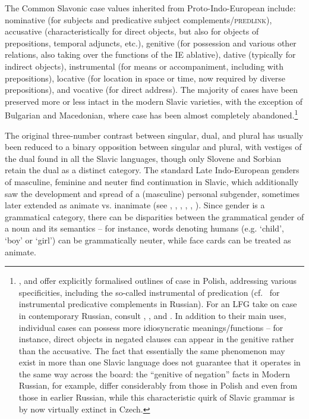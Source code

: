 \documentclass[output=paper,hidelinks]{langscibook}
\begin{document}
The Common Slavonic case values inherited from Proto-Indo-European include: nominative (for subjects and predicative subject complements/\textsc{predlink}), accusative (characteristically for direct objects, but also for objects of prepositions, temporal adjuncts, etc.), genitive (for possession and various other relations, also taking over the functions of the IE ablative), dative (typically for indirect objects), instrumental (for means or accompaniment, including with prepositions), locative (for location in space or time, now required by diverse prepositions), and vocative (for direct address). The majority of cases have been preserved more or less intact in the modern Slavic varieties, with the exception of Bulgarian and Macedonian, where case has been almost completely abandoned.\footnote{\citet{PrzepiorkowskiPatejuk2011,przepiorkowski-patejuk2012,prz:pat:12b,przepiorkowski2015two}, \citet{Patejuk2015} and \citet{PatejukPrzepiorkowski2014b,PatejukPrzepiorkowski2014a,PatejukPrzepiorkowski2018} offer explicitly formalised outlines of case in Polish, addressing various specificities, including the so-called instrumental of predication (cf.\ \citealt[192]{dalrympleetal04copular} for instrumental predicative complements in Russian). For an LFG take on case in contemporary Russian, consult \citet{Neidle1988}, \citet[Chapter 8]{King95}, and \citet[422--425]{BresnanEtAl2016}. In addition to their main uses, individual cases can possess more idiosyncratic meanings/functions -- for instance, direct objects in negated clauses can appear in the genitive rather than the accusative. The fact that essentially the same phenomenon may exist in more than one Slavic language does not guarantee that it operates in the same way across the board: the ``genitive of negation'' facts in Modern Russian, for example, differ considerably from those in Polish and even from those in earlier Russian, while this characteristic quirk of Slavic grammar is by now virtually extinct in Czech.}

The original three-number contrast between singular, dual, and plural has usually been reduced to a binary opposition between singular and plural, with vestiges of the dual found in all the Slavic languages, though only Slovene and Sorbian retain the dual as a distinct category. The standard Late Indo-European genders of masculine, feminine and neuter find continuation in Slavic, which additionally saw the development and spread of a (masculine) personal subgender, sometimes later extended as animate vs. inanimate (see \citealt[319, 363--364]{Browne1993}, \citealt[696--698]{Rothstein1993}, \citealt[108]{Schenker1993}, \citealt[836ff]{Timberlake1993}, \citealt[Section~2]{Kibort2006}, \citealt{BergerGutschmidtKempgenKosta2009}). Since gender is a grammatical category, there can be disparities between the grammatical gender of a noun and its semantics -- for instance, words denoting humans (e.g. `child', `boy' or `girl') can be grammatically neuter, while face cards can be treated as animate.
\end{document}
